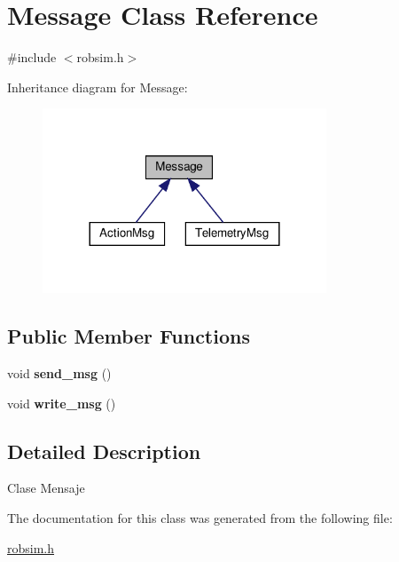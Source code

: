\hypertarget{class_message}{}\section{Message Class Reference}
\label{class_message}


{\ttfamily \#include $<$robsim.\+h$>$}



Inheritance diagram for Message\+:
\nopagebreak
\begin{figure}[H]
\begin{center}
\leavevmode
\includegraphics[width=240pt]{class_message__inherit__graph}
\end{center}
\end{figure}
\subsection*{Public Member Functions}
\begin{DoxyCompactItemize}
\item 
\mbox{\label{class_message_ab6e3a5a318b80908269f1e9f7110aed9}} 
void {\bfseries send\+\_\+msg} ()
\item 
\mbox{\label{class_message_a74bb67f72c24f9d2367fd82df28b8843}} 
void {\bfseries write\+\_\+msg} ()
\end{DoxyCompactItemize}


\subsection{Detailed Description}
Clase Mensaje 

The documentation for this class was generated from the following file\+:\begin{DoxyCompactItemize}
\item 
\hyperlink{robsim_8h}{robsim.\+h}\end{DoxyCompactItemize}
